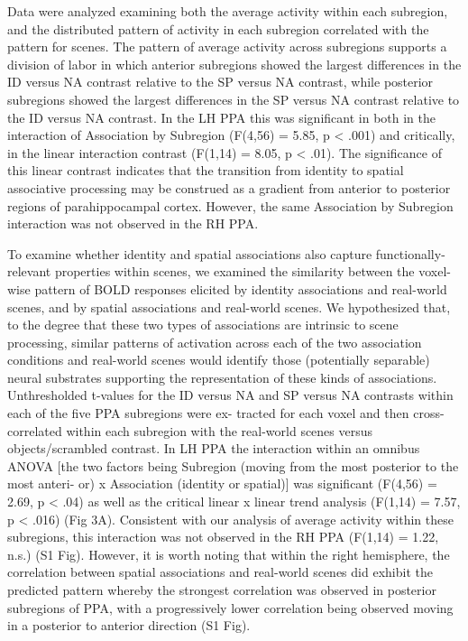 \documentclass[english]{article}
\begin{document}
%
Data were analyzed examining both the average activity within each subregion,
and the distributed pattern of activity in each subregion correlated with the
pattern for scenes\citep{aminoff2015associative}.
%
The pattern of average activity across subregions supports a division of labor
in which anterior subregions showed the largest differences in the ID versus NA
contrast relative to the SP versus NA contrast, while posterior subregions
showed the largest differences in the SP versus NA contrast relative to the ID
versus NA contrast\citep{aminoff2015associative}.
%
In the LH PPA this was significant in both in the interaction of Association by
Subregion (F(4,56) = 5.85, p < .001) and critically, in the linear interaction
contrast (F(1,14) = 8.05, p < .01)\citep{aminoff2015associative}.
%
The significance of this linear contrast indicates that the transition from
identity to spatial associative processing may be construed as a gradient from
anterior to posterior regions of parahippocampal cortex. However, the same
Association by Subregion interaction was not observed in the RH PPA\citep{aminoff2015associative}.

%
To examine whether identity and spatial associations also capture
functionally-relevant properties within scenes, we examined the similarity
between the voxel-wise pattern of BOLD responses elicited by identity
associations and real-world scenes, and by spatial associations and real-world
scenes\citep{aminoff2015associative}.
%
We hypothesized that, to the degree that these two types of associations are
intrinsic to scene processing, similar patterns of activation across each of the
two association conditions and real-world scenes would identify those
(potentially separable) neural substrates supporting the representation of these
kinds of associations\citep{aminoff2015associative}.
%
Unthresholded t-values for the ID versus NA and SP versus NA contrasts within
each of the five PPA subregions were ex- tracted for each voxel and then
cross-correlated within each subregion with the real-world scenes versus
objects/scrambled contrast\citep{aminoff2015associative}.
%
In LH PPA the interaction within an omnibus ANOVA [the two factors being
Subregion (moving from the most posterior to the most anteri- or) x Association
(identity or spatial)] was significant (F(4,56) = 2.69, p < .04) as well as the
critical linear x linear trend analysis (F(1,14) = 7.57, p < .016) (Fig 3A)\citep{aminoff2015associative}.
%
Consistent with our analysis of average activity within these subregions, this
interaction was not observed in the RH PPA (F(1,14) = 1.22, n.s.) (S1 Fig)\citep{aminoff2015associative}.
%
However, it is worth noting that within the right hemisphere, the correlation
between spatial associations and real-world scenes did exhibit the predicted
pattern whereby the strongest correlation was observed in posterior subregions
of PPA, with a progressively lower correlation being observed moving in a
posterior to anterior direction (S1 Fig)\citep{aminoff2015associative}.
\end{document}
